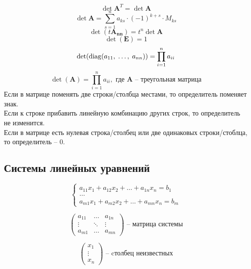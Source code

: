 \begin{equation} \det \bm{A}^T = \det \bm{A} \end{equation}
\begin{equation} \det \bm{A} = \sum_{s=1}^{n} a_{ks} \cdot (-1)^{k+s} \cdot M_{ks} \end{equation}
\begin{equation} \det(t\bm{A_{nn}}) = t^n \det\bm{A} \end{equation}
\begin{equation} \det(\bm{E}) = 1 \end{equation}
\begin{equation} \det({\rm diag}({a_{11},\; \ldots,\; a_{nn}})) = \prod_{i=1}^{n} a_{ii} \end{equation}
\begin{equation} \det(\bm{A}) = \prod_{i=1}^{n} a_{ii}, \text{ где $\bm{A}$ -- треугольная матрица} \end{equation}
Если в матрице поменять две строки/столбца местами, то определитель поменяет знак. \\
Если к строке прибавить линейную комбинацию других строк, то определитель не изменится. \\
Если в матрице есть нулевая строка/столбец или две одинаковых строки/стоблца, то определитель -- 0.


\subsection{Системы линейных уравнений}
\begin{equation*}
    \begin{cases}
        a_{11}x_1 + a_{12}x_2 + \ldots + a_{1n} x_n = b_1 \\
        \ldots \\
        a_{m1}x_1 + a_{m2}x_2 + \ldots + a_{mn} x_n = b_m
    \end{cases}
\end{equation*}

\begin{equation}
    \begin{pmatrix}
        a_{11} & \ldots & a_{1n} \\
        \vdots & \ddots & \vdots \\
        a_{m1} & \ldots & a_{mn}
    \end{pmatrix}\text{ -- матрица системы}
\end{equation}

\begin{equation}
    \begin{pmatrix}
        x_1 \\
        \vdots \\
        x_n
    \end{pmatrix}\text{ -- cтолбец неизвестных}
\end{equation}


